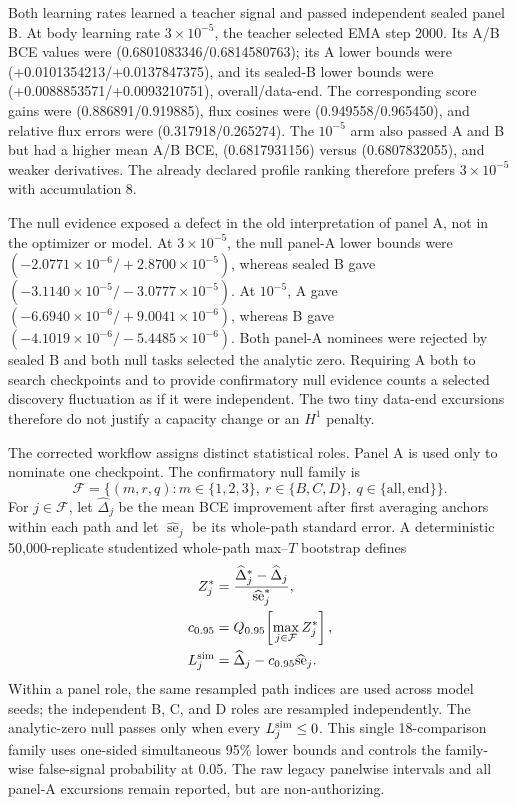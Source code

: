 \documentclass[11pt]{article}
\numberwithin{equation}{section}
\newcommand{\1}{\mathbf 1}
\begin{document}
Both learning rates learned a teacher signal and passed independent sealed
panel B.  At body learning rate \(3\mathbin{\times}10^{-5}\), the teacher
selected EMA step 2000.  Its A/B BCE values were
(0.6801083346/0.6814580763); its A lower bounds were
(+0.0101354213/+0.0137847375), and its sealed-B lower bounds were
(+0.0088853571/+0.0093210751), overall/data-end.  The corresponding
score gains were (0.886891/0.919885), flux cosines were
(0.949558/0.965450), and relative flux errors were
(0.317918/0.265274).  The \(10^{-5}\) arm also passed A and B but had a
higher mean A/B BCE, (0.6817931156) versus (0.6807832055), and weaker
derivatives.  The already declared profile ranking therefore prefers
\(3\mathbin{\times}10^{-5}\) with accumulation 8.

The null evidence exposed a defect in the old interpretation of panel A, not
in the optimizer or model.  At \(3\mathbin{\times}10^{-5}\), the null
panel-A lower bounds were
\((-2.0771\mathbin{\times}10^{-6}/+2.8700\mathbin{\times}10^{-5})\), whereas
sealed B gave
\((-3.1140\mathbin{\times}10^{-5}/-3.0777\mathbin{\times}10^{-5})\).  At
\(10^{-5}\), A gave
\((-6.6940\mathbin{\times}10^{-6}/+9.0041\mathbin{\times}10^{-6})\), whereas
B gave
\((-4.1019\mathbin{\times}10^{-6}/-5.4485\mathbin{\times}10^{-6})\).
Both panel-A nominees were rejected by sealed B and both null tasks selected
the analytic zero.  Requiring A both to search checkpoints and to provide
confirmatory null evidence counts a selected discovery fluctuation as if it
were independent.  The two tiny data-end excursions therefore do not justify
a capacity change or an \(H^1\) penalty.

The corrected workflow assigns distinct statistical roles.  Panel A is used
only to nominate one checkpoint.  The confirmatory null family is
\[
  \mathcal F
  =\{(m,r,q):m\in\{1,2,3\},\ r\in\{B,C,D\},\
                 q\in\{\mathrm{all},\mathrm{end}\}\}.
\]
For \(j\in\mathcal F\), let \(\widehat\Delta_j\) be the mean BCE improvement
after first averaging anchors within each path and let
\(\widehat{\operatorname{se}}_j\) be its whole-path standard error.  A
deterministic 50,000-replicate studentized whole-path max--\(T\) bootstrap
defines
\begin{align}
 Z_j^*&=\frac{\widehat\Delta_j^*-\widehat\Delta_j}
                    {\widehat{\operatorname{se}}_j^*},\\
 c_{0.95}
  &=Q_{0.95}\!\left[\max_{j\in\mathcal F}Z_j^*\right],\\
 L_j^{\rm sim}
  &=\widehat\Delta_j-c_{0.95}\widehat{\operatorname{se}}_j.
\end{align}
Within a panel role, the same resampled path indices are used across model
seeds; the independent B, C, and D roles are resampled independently.  The
analytic-zero null passes only when every \(L_j^{\rm sim}\leq0\).  This single
18-comparison family uses one-sided simultaneous 95\% lower bounds and
controls the family-wise false-signal probability at 0.05.  The raw legacy
panelwise intervals and all panel-A excursions remain reported, but are
non-authorizing.
\end{document}
